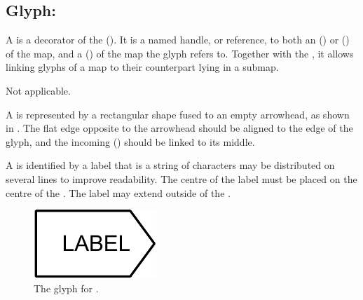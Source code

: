 
\subsection{Glyph: }
\label{sec:submapTerminal}

A  is a decorator of the  ().
It is a named handle, or reference, to both an  () or  () of the map, and a  () of the map the  glyph refers to.
Together with the , it allows linking glyphs of a map to their counterpart lying in a submap.

\begin{glyphDescription}

\glyphSboTerm Not applicable.



\glyphContainer A  is represented by a rectangular shape fused to an empty arrowhead, as shown in .
The flat edge opposite to the arrowhead should be aligned to the edge of the  glyph, and the incoming  () should be linked to its middle.

\glyphLabel A  is identified by a label that is  a string of characters  may be distributed on several lines to improve readability.
The centre of the label must be placed on the centre of the .
The label may extend outside of the .

\glyphAux
{}

\end{glyphDescription}


\begin{figure}[H]
  \centering
  \includegraphics{images/submapterminal}
  \caption{The \PD glyph for .}
  \label{fig:submapTerminal}
\end{figure}


